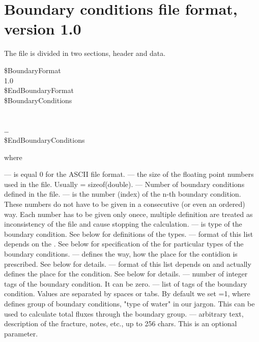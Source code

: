 \section*{Boundary conditions file format, version 1.0}
The file is divided in two sections, header and data.
\begin{fileformat}
\$BoundaryFormat\\
  1.0  \\
\$EndBoundaryFormat\\
\$BoundaryConditions\\
  \\
    
   
    \vari{[text]}\\
  \dots\\
\$EndBoundaryConditions\\
\end{fileformat}
where
\begin{description}
  --- is equal 0 for the ASCII file format.
  --- the size of the floating point numbers used in
  the file. Usually  = sizeof(double).
  --- Number of boundary conditions defined in the
  file.
  --- is the number (index) of the n-th boundary
  condition. These numbers do not have to be given in a consecutive (or even an
  ordered) way. Each number has to be given only onece, multiple definition
  are treated as inconsistency of the file and cause stopping the
  calculation.
  --- is type of the boundary condition. See below for
   definitions of the types.
  --- format of this list depends on the
   . See below for specification of the 
   for particular types of the boundary conditions.
  --- defines the way, how the place for the contidion is
   prescribed. See below for details.
  --- format of this list depends on 
   and actually defines the place for the condition. See below for details.
  --- number of integer tags of the boundary
  condition. It can be zero.
  --- list of tags of the
   boundary condition. Values are
   separated by spaces or tabs. By default we set
   =1, where  defines group of boundary
   conditions, "type of water" in our jargon. This can be used to calculate total fluxes through 
   the boundary group.
  --- arbitrary text, description of the fracture, notes,
   etc., up to 256 chars. This is an optional parameter.
\end{description}
